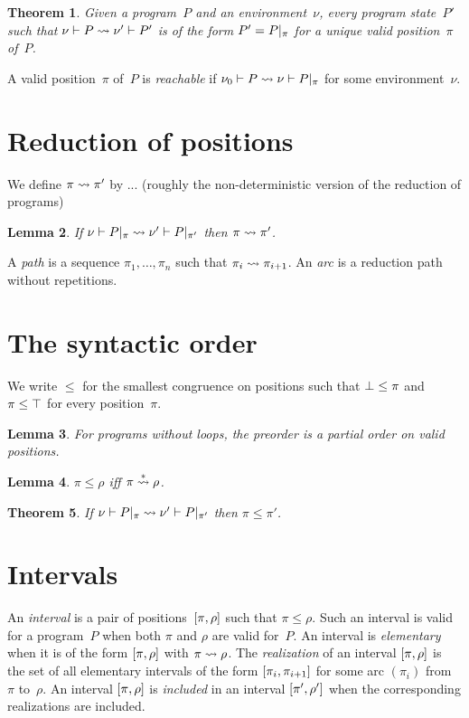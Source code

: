 \documentclass[a4paper]{article}
\theoremstyle{theorem}
\newtheorem{theorem}{Theorem}
\newtheorem{lemma}[theorem]{Lemma}
\theoremstyle{example}
\theoremstyle{remark}
\begin{document}
\begin{theorem}
  Given a program~$P$ and an environment~$\nu$, every program state~$P'$ such
  that $\penv\nu P\redto\penv{\nu'}{P'}$ is of the form $P'=\postate\pi P$ for a
  unique valid position~$\pi$ of~$P$.
\end{theorem}

\noindent
A valid position~$\pi$ of~$P$ is \emph{reachable} if
$\penv{\nu_0} P\redto\penv\nu{\postate\pi P}$ for some environment~$\nu$.

\section{Reduction of positions}
We define $\pi\redto\pi'$ by ... (roughly the non-deterministic version of the
reduction of programs)

\begin{lemma}
  If $\penv\nu{\postate\pi P}\redto\penv{\nu'}{\postate{\pi'}P}$ then
  $\pi\redto\pi'$.
\end{lemma}

\noindent
A \emph{path} is a sequence $\pi_1,\ldots,\pi_n$ such that
$\pi_i\redto\pi_{i+1}$. An \emph{arc} is a reduction path without repetitions.

\section{The syntactic order}
We write $\leq$ for the smallest congruence on positions such that
$\pbot\leq\pi$ and $\pi\leq\ptop$ for every position~$\pi$.

\begin{lemma}
  For programs without loops, the preorder is a partial order on valid
  positions.
\end{lemma}

\begin{lemma}
  $\pi\leq\rho$ iff $\pi\overset*\redto\rho$.
\end{lemma}

\begin{theorem}
  If $\penv\nu{\postate\pi P}\redto\penv{\nu'}{\postate{\pi'}P}$ then
  $\pi\leq\pi'$.
\end{theorem}

\section{Intervals}
An \emph{interval} is a pair of positions~$\intv\pi\rho$ such that
$\pi\leq\rho$. Such an interval is valid for a program~$P$ when both $\pi$ and
$\rho$ are valid for~$P$.  An interval is \emph{elementary} when it is of the
form $\intv\pi\rho$ with $\pi\redto\rho$. The \emph{realization} of an interval
$\intv\pi\rho$ is the set of all elementary intervals of the form
$\intv{\pi_i}{\pi_{i+1}}$ for some arc $(\pi_i)$ from~$\pi$ to~$\rho$.  An
interval $\intv\pi\rho$ is \emph{included} in an interval $\intv{\pi'}{\rho'}$
when the corresponding realizations are included.
\end{document}
